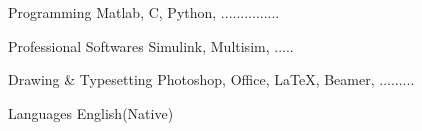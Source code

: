 \vspace{-5.0mm}         
\begin{cvskills}

\cvskill
   {Programming} %
    {Matlab, C, Python, ...............} %

  \cvskill
   {Professional Softwares} %
   {Simulink, Multisim, .....} %

  \cvskill
{Drawing \& Typesetting} %
{Photoshop, Office, \textrm{\LaTeX}, Beamer, .........} %

  \cvskill
   {Languages} %
   {English(Native)} %
 \vspace{-8.0mm}  
\end{cvskills}
